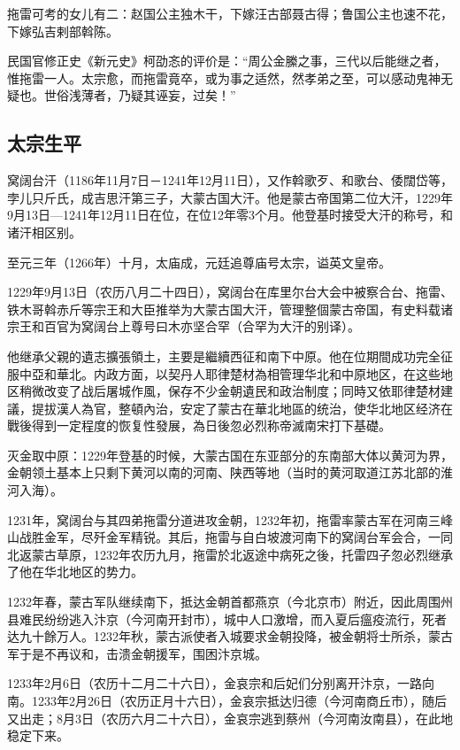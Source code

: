 拖雷可考的女儿有二：赵国公主独木干，下嫁汪古部聂古得；鲁国公主也速不花，下嫁弘吉剌部斡陈。

民国官修正史《新元史》柯劭忞的评价是：“周公金縢之事，三代以后能继之者，惟拖雷一人。太宗愈，而拖雷竟卒，或为事之适然，然孝弟之至，可以感动鬼神无疑也。世俗浅薄者，乃疑其诬妄，过矣！”


\subsection{太宗生平}

窝阔台汗（1186年11月7日－1241年12月11日），又作斡歌歹、和歌台、倭闊岱等，孛儿只斤氏，成吉思汗第三子，大蒙古国大汗。他是蒙古帝国第二位大汗，1229年9月13日—1241年12月11日在位，在位12年零3个月。他登基时接受大汗的称号，和诸汗相区别。

至元三年（1266年）十月，太庙成，元廷追尊庙号太宗，谥英文皇帝。

1229年9月13日（农历八月二十四日），窝阔台在库里尔台大会中被察合台、拖雷、铁木哥斡赤斤等宗王和大臣推举为大蒙古国大汗，管理整個蒙古帝国，有史料载诸宗王和百官为窝阔台上尊号曰木亦坚合罕（合罕为大汗的别译）。

他继承父親的遺志擴張領土，主要是繼續西征和南下中原。他在位期間成功完全征服中亞和華北。内政方面，以契丹人耶律楚材為相管理华北和中原地区，在这些地区稍微改变了战后屠城作風，保存不少金朝遺民和政治制度；同時又依耶律楚材建議，提拔漢人為官，整頓內治，安定了蒙古在華北地區的统治，使华北地区经济在戰後得到一定程度的恢复性發展，為日後忽必烈称帝滅南宋打下基礎。

灭金取中原：1229年登基的时候，大蒙古国在东亚部分的东南部大体以黄河为界，金朝领土基本上只剩下黄河以南的河南、陕西等地（当时的黄河取道江苏北部的淮河入海）。

1231年，窝阔台与其四弟拖雷分道进攻金朝，1232年初，拖雷率蒙古军在河南三峰山战胜金军，尽歼金军精锐。其后，拖雷与自白坡渡河南下的窝阔台军会合，一同北返蒙古草原，1232年农历九月，拖雷於北返途中病死之後，托雷四子忽必烈继承了他在华北地区的势力。

1232年春，蒙古军队继续南下，抵达金朝首都燕京（今北京市）附近，因此周围州县难民纷纷逃入汴京（今河南开封市），城中人口激增，而入夏后瘟疫流行，死者达九十餘万人。1232年秋，蒙古派使者入城要求金朝投降，被金朝将士所杀，蒙古军于是不再议和，击溃金朝援军，围困汴京城。

1233年2月6日（农历十二月二十六日），金哀宗和后妃们分别离开汴京，一路向南。1233年2月26日（农历正月十六日），金哀宗抵达归德（今河南商丘市），随后又出走；8月3日（农历六月二十六日），金哀宗逃到蔡州（今河南汝南县），在此地稳定下来。

